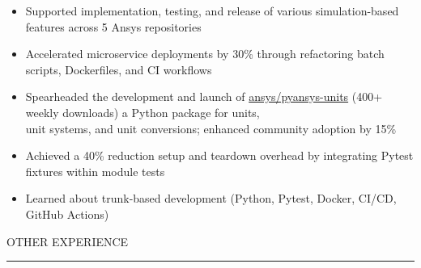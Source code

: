 \documentclass[9pt]{extarticle}
\begin{document}
\begin{adjustwidth}{10pt}{10pt}
	\begin{itemize}[topsep=0pt]
		\item Supported implementation, testing, and release of various simulation-based features across \textcolor{imptextblack}{5} Ansys repositories
		\item Accelerated microservice deployments by \textcolor{imptextblack}{30\%} through refactoring batch scripts, Dockerfiles, and CI workflows
		\item Spearheaded the development and launch of \href{https://github.com/ansys/pyansys-units}{ansys/pyansys-units} (\textcolor{imptextblack}{400+} weekly downloads) a Python package for units, \\
			unit systems, and unit conversions; enhanced community adoption by \textcolor{imptextblack}{15\%}
		\item Achieved a \textcolor{imptextblack}{40\%} reduction setup and teardown overhead by integrating Pytest fixtures within module tests
		\item Learned about \textcolor{imptextblack}{trunk-based} development (Python, Pytest, Docker, CI/CD, GitHub Actions)
	\end{itemize}
\end{adjustwidth}

\vspace{5pt}

\begin{adjustwidth}{4pt}{4pt} \large OTHER EXPERIENCE \end{adjustwidth}
\rule[8pt]{\linewidth}{0.4pt}
\end{document}
